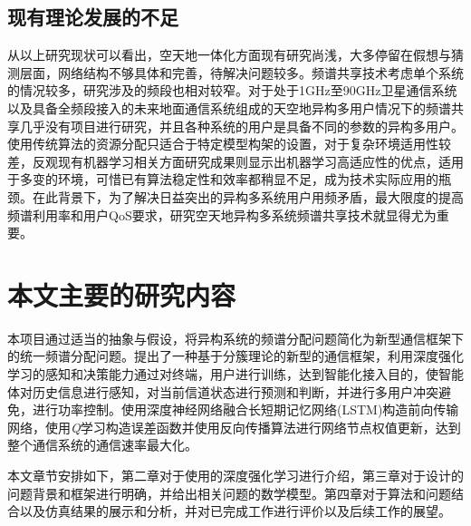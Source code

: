 \subsection{现有理论发展的不足}

从以上研究现状可以看出，空天地一体化方面现有研究尚浅，大多停留在假想与猜测层面，网络结构不够具体和完善，待解决问题较多。频谱共享技术考虑单个系统的情况较多，研究涉及的频段也相对较窄。对于处于1GHz至90GHz卫星通信系统以及具备全频段接入的未来地面通信系统组成的天空地异构多用户情况下的频谱共享几乎没有项目进行研究，并且各种系统的用户是具备不同的参数的异构多用户。使用传统算法的资源分配只适合于特定模型构架的设置，对于复杂环境适用性较差，反观现有机器学习相关方面研究成果则显示出机器学习高适应性的优点，适用于多变的环境，可惜已有算法稳定性和效率都稍显不足，成为技术实际应用的瓶颈。在此背景下，为了解决日益突出的异构多系统用户用频矛盾，最大限度的提高频谱利用率和用户QoS要求，研究空天地异构多系统频谱共享技术就显得尤为重要。

\section{本文主要的研究内容}

本项目通过适当的抽象与假设，将异构系统的频谱分配问题简化为新型通信框架下的统一频谱分配问题。提出了一种基于分簇理论的新型的通信框架，利用深度强化学习的感知和决策能力通过对终端，用户进行训练，达到智能化接入目的，使智能体对历史信息进行感知，对当前信道状态进行预测和判断，并进行多用户冲突避免，进行功率控制。使用深度神经网络融合长短期记忆网络(LSTM)构造前向传输网络，使用\textit{Q}学习构造误差函数并使用反向传播算法进行网络节点权值更新，达到整个通信系统的通信速率最大化。

本文章节安排如下，第二章对于使用的深度强化学习进行介绍，第三章对于设计的问题背景和框架进行明确，并给出相关问题的数学模型。第四章对于算法和问题结合以及仿真结果的展示和分析，并对已完成工作进行评价以及后续工作的展望。
